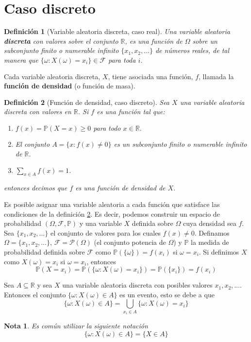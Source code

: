 \documentclass[11pt]{report}
\theoremstyle{break}
\newtheorem{definicion}{Definición}[chapter]
\newtheorem{nota}{Nota}[chapter]
\theoremstyle{break}
\begin{document}
\section{Caso discreto}
\label{seccion:variables discretas}
\begin{definicion}[Variable aleatoria discreta, caso real]
Una variable aleatoria \textbf{discreta} con valores sobre el conjunto $\mathbb{R}$, es una función de $\Omega$ sobre un subconjunto finito o numerable infinito $\{x_1, x_2, \ldots\}$ de números reales, de tal manera que $\{\omega: X(\omega) = x_i \} \in \mathcal{F}$ para toda $i$.
\end{definicion}
Cada variable aleatoria discreta, $X$, tiene asociada una función, $f$, llamada la \textbf{función de densidad} (o función de masa).

\begin{definicion}[Función de densidad, caso discreto]
\label{definicion:funcion de densidad, caso discreto}
Sea $X$ una variable aleatoria discreta con valores en $\mathbb{R}$. Si $f$ es una función tal que:
\begin{enumerate}[label=\alph*)]
\item $f(x) = \mathbb{P}(X = x) \geq 0$ para todo $x \in \mathbb{R}$.
\item El conjunto $A = \{x: f(x) \neq 0 \}$ es un subconjunto finito o numerable infinito de $\mathbb{R}$.
\item $\sum_{x \in A} f(x) = 1$.
\end{enumerate}
entonces decimos que $f$ es una función de densidad de $X$.
\end{definicion}

Es posible asignar una variable aleatoria a cada función que satisface las condiciones de la definición \ref{definicion:funcion de densidad, caso discreto}. Es decir, podemos construir un espacio de probabilidad $(\Omega, \mathcal{F}, \mathbb{P})$ y una variable $X$ definida sobre $\Omega$ cuya densidad sea $f$. Sea $\{x_1, x_2, \ldots \}$ el conjunto de valores para los cuales $f(x) \neq 0$. Definamos $\Omega = \{x_1, x_2, \ldots \}$, $\mathcal{F} = \mathcal{P}(\Omega)$ (el conjunto potencia de $\Omega$) y $\mathbb{P}$ la medida de probabilidad definida sobre $\mathcal{F}$ como $\mathbb{P}( \{\omega \} ) = f(x_i)$ si $\omega = x_i$. Si definimos $X$ como $X(\omega) = x_i$ si $\omega = x_i$, entonces
$$
\mathbb{P}(X = x_i) = \mathbb{P}(\{\omega: X(\omega) = x_i \}) = \mathbb{P}(\{x_i\}) = f(x_i)
$$

Sea $A \subseteq \mathbb{R}$ y sea $X$ una variable aleatoria discreta con posibles valores $x_1, x_2, \ldots$. Entonces el conjunto $\{\omega: X(\omega) \in A  \}$ es un evento, esto se debe a que
$$
\{\omega: X(\omega) \in A  \} = \bigcup_{x_i \in A} \{\omega: X(\omega) = x_i \}
$$
\begin{nota}
Es común utilizar la siguiente notación
$$
\{\omega: X(\omega) \in A  \} = \{X \in A\}
$$
\end{nota}
\end{document}
